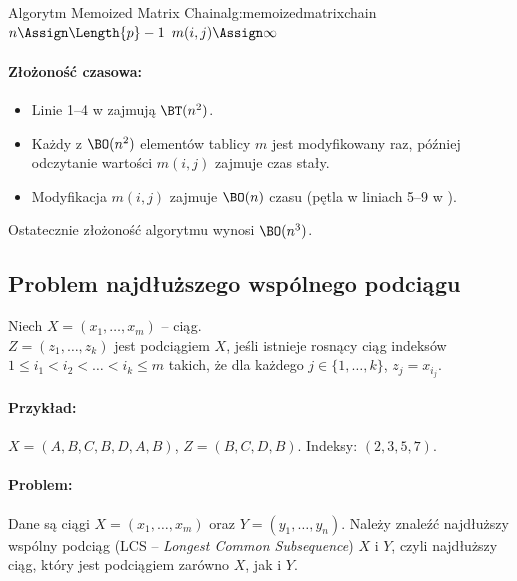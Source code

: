 \begin{alg}{Algorytm Memoized Matrix Chain}{alg:memoizedmatrixchain}
	\State $n \Assign \Length{p} - 1$
	\State $m(i, j) \Assign \infty$
	\EndFor
	\EndFor
	\State \Return {}
	\EndFunction
\end{alg}

\paragraph{Złożoność czasowa:}
\begin{itemize}
	\item Linie 1--4 w  zajmują $\BT(n^2)$.
	\item Każdy z $\BO(n^2)$ elementów tablicy $m$ jest modyfikowany raz, później odczytanie wartości $m(i, j)$ zajmuje czas stały.
	\item Modyfikacja $m(i, j)$ zajmuje $\BO(n)$ czasu (pętla w liniach 5--9 w ).
\end{itemize}
Ostatecznie złożoność algorytmu wynosi $\BO(n^3)$.


\subsection{Problem najdłuższego wspólnego podciągu}

Niech $X = (x_1, \dots, x_m)$ -- ciąg. \\
$Z = (z_1, \dots, z_k)$ jest podciągiem $X$, jeśli istnieje rosnący ciąg indeksów $1 \leq i_1 < i_2 < \dots < i_k \leq m$ takich, że dla każdego $j \in \{1, \dots, k\}$, $z_j = x_{i_j}$.

\paragraph{Przykład:}
$X = (A, B, C, B, D, A, B)$, $Z = (B, C, D, B)$.
Indeksy: $(2, 3, 5, 7)$.

\paragraph{Problem:}
Dane są ciągi $X = (x_1, \dots, x_m)$ oraz $Y = (y_1, \dots, y_n)$. 
Należy znaleźć najdłuższy wspólny podciąg (LCS -- \textit{Longest Common Subsequence}) $X$ i $Y$, czyli najdłuższy ciąg, który jest podciągiem zarówno $X$, jak i $Y$.

